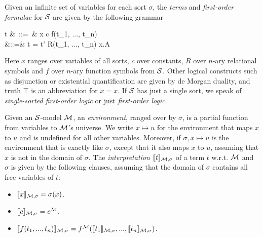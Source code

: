 Given an infinite set of variables for each sort $\sigma$, the
\emph{terms} and \emph{first-order formulae} for $\mathcal{S}$ are given by
the following grammar
\begin{GRAMMAR}
  t &\ ::=\ & x \VERTICAL c \VERTICAL f(t_1, ..., t_n) \\[1mm]
  \phi &::=& t = t' \VERTICAL R(t_1, ..., t_n) \VERTICAL \neg \phi \VERTICAL \phi \AND \psi \VERTICAL \forall x.A
\end{GRAMMAR}

\NI Here $x$ ranges over variables of all sorts, $c$ over constants,
$R$ over $n$-ary relational symbols and $f$ over $n$-ary function
symbols from $\mathcal{S}$.  Other logical constructs such as disjunction or
existential quantification are given by de Morgan duality, and truth
$\top$ is an abbreviation for $x = x$. If $\mathcal{S}$ has just a single
sort, we speak of \emph{single-sorted first-order logic} or just
\emph{first-order logic}. 

Given an $\mathcal{S}$-model $\mathcal{M}$, an \emph{environment}, ranged over by
$\sigma$, is a partial function from variables to $\mathcal{M}$'s
universe.  We write $x \mapsto u$ for the environment that maps $x$ to
$u$ and is undefined for all other variables. Moreover, if $\sigma, x
\mapsto u$ is the environment that is exactly like $\sigma$, except
that it also maps $x$ to $u$, assuming that $x$ is not in the domain
of $\sigma$.  The \emph{interpretation} $\lbrack\!\lbrack t \rbrack\!\rbrack_{\mathcal{M}, \sigma}$
of a term $t$ w.r.t. $\mathcal{M}$ and $\sigma$ is given by the following
clauses, assuming that the domain of $\sigma$ contains all free
variables of $t$:
\begin{itemize}

\item $\lbrack\!\lbrack x \rbrack\!\rbrack_{\mathcal{M}, \sigma} = \sigma(x)$.
\item $\lbrack\!\lbrack c \rbrack\!\rbrack_{\mathcal{M}, \sigma} = c^{\mathcal{M}}$.
\item $\lbrack\!\lbrack f(t_1, ..., t_n) \rbrack\!\rbrack_{\mathcal{M}, \sigma} =
  f^{\mathcal{M}}(\lbrack\!\lbrack t_1 \rbrack\!\rbrack_{\mathcal{M}, \sigma}, ..., \lbrack\!\lbrack t_n \rbrack\!\rbrack_{\mathcal{M},
    \sigma})$.

\end{itemize}

